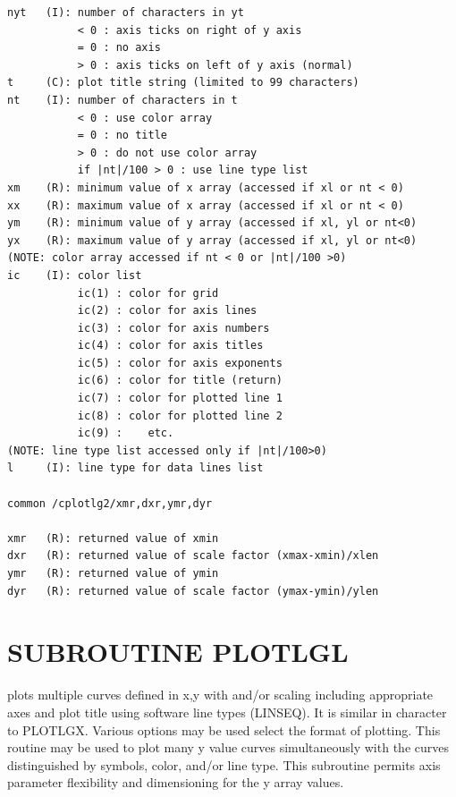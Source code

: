 \documentclass[11pt]{report}
\begin{document}
\begin{verbatim}
nyt   (I): number of characters in yt
           < 0 : axis ticks on right of y axis
           = 0 : no axis
           > 0 : axis ticks on left of y axis (normal)
t     (C): plot title string (limited to 99 characters)
nt    (I): number of characters in t
           < 0 : use color array
           = 0 : no title
           > 0 : do not use color array
           if |nt|/100 > 0 : use line type list
xm    (R): minimum value of x array (accessed if xl or nt < 0)
xx    (R): maximum value of x array (accessed if xl or nt < 0)
ym    (R): minimum value of y array (accessed if xl, yl or nt<0)
yx    (R): maximum value of y array (accessed if xl, yl or nt<0)
(NOTE: color array accessed if nt < 0 or |nt|/100 >0)
ic    (I): color list
           ic(1) : color for grid
           ic(2) : color for axis lines
           ic(3) : color for axis numbers
           ic(4) : color for axis titles
           ic(5) : color for axis exponents
           ic(6) : color for title (return)
           ic(7) : color for plotted line 1
           ic(8) : color for plotted line 2
           ic(9) :    etc.
(NOTE: line type list accessed only if |nt|/100>0)
l     (I): line type for data lines list 

common /cplotlg2/xmr,dxr,ymr,dyr

xmr   (R): returned value of xmin
dxr   (R): returned value of scale factor (xmax-xmin)/xlen
ymr   (R): returned value of ymin
dyr   (R): returned value of scale factor (ymax-ymin)/ylen
\end{verbatim}
\newpage
\section{SUBROUTINE PLOTLGL}

 plots multiple curves defined in x,y with  and/or 
scaling including appropriate axes and plot title using software line
types (LINSEQ).  It is similar in character to PLOTLGX. Various options
may be used select the format of plotting.  This routine may be used
to plot many y value curves simultaneously with the curves distinguished
by symbols, color, and/or line type.  This subroutine permits axis
parameter flexibility and dimensioning for the y array values.
\end{document}
